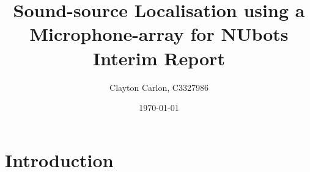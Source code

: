 \documentclass{beamer}
\title{
	Sound-source Localisation using a Microphone-array for NUbots\\
	Interim Report
}
\author{Clayton Carlon, C3327986}
\date{\today}
\begin{document}
\frame{\titlepage}

\section{Introduction}

\end{document}
